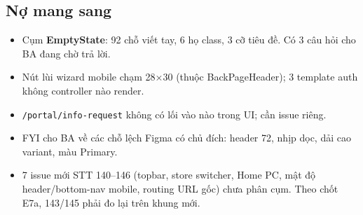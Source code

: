 \subsection*{Nợ mang sang}
\begin{itemize}[nosep]
\item Cụm \textbf{EmptyState}: 92 chỗ viết tay, 6 họ class, 3 cỡ tiêu đề. Có 3 câu hỏi cho BA đang chờ trả lời.
\item Nút lùi wizard mobile chạm 28×30 (thuộc BackPageHeader); 3 template auth không controller nào render.
\item \texttt{/portal/info-request} không có lối vào nào trong UI; cần issue riêng.
\item FYI cho BA về các chỗ lệch Figma có chủ đích: header 72, nhịp dọc, dải cao variant, màu Primary.
\item 7 issue mới STT 140--146 (topbar, store switcher, Home PC, mật độ header/bottom-nav mobile, routing
  URL gốc) chưa phân cụm. Theo chốt E7a, 143/145 phải đo lại trên khung mới.
\end{itemize}

